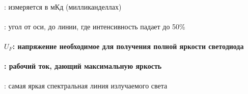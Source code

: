 
\paragraph{}: измеряется в мКд
(милликанделлах)

\paragraph{}: угол от оси, до линии, где
интенсивность падает до 50\%

\paragraph{\textbf{
$U_{F}$}:
напряжение необходимое для получения полной яркости светодиода}

\paragraph{\textbf{}: рабочий ток,
дающий максимальную яркость}

\paragraph{}: самая яркая
спектральная линия излучаемого света
